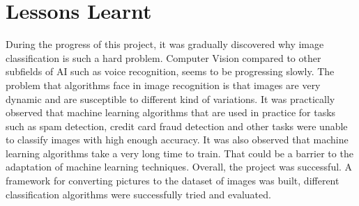 \section{Lessons Learnt}

During the progress of this project, it was gradually discovered why image classification is such a hard problem. Computer Vision compared to other subfields of AI such as voice recognition, seems to be progressing slowly.  The problem that algorithms face in image recognition is that images are very dynamic and are susceptible to different kind of variations. It was practically observed that machine learning algorithms that are used in practice for tasks such as spam detection, credit card fraud detection and other tasks were unable to classify images with high enough accuracy.  It was also observed that machine learning algorithms take a very long time to train. That could be a barrier to the adaptation of machine learning techniques. Overall, the project was successful. A framework for converting pictures to the dataset of images was built, different classification algorithms were successfully tried and evaluated.
